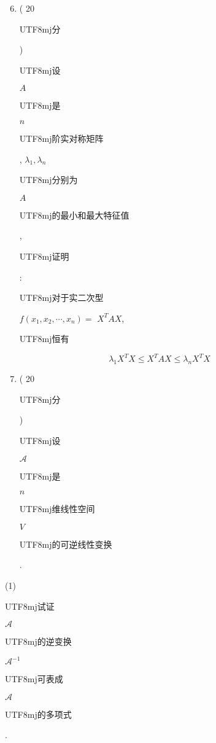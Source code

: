 \documentclass[10pt]{article}
\begin{document}
\begin{enumerate}
  \setcounter{enumi}{5}
  \item ( 20 \begin{CJK}{UTF8}{mj}分\end{CJK}) \begin{CJK}{UTF8}{mj}设\end{CJK} $A$ \begin{CJK}{UTF8}{mj}是\end{CJK} $n$ \begin{CJK}{UTF8}{mj}阶实对称矩阵\end{CJK}, $\lambda_{1}, \lambda_{n}$ \begin{CJK}{UTF8}{mj}分别为\end{CJK} $A$ \begin{CJK}{UTF8}{mj}的最小和最大特征值\end{CJK}, \begin{CJK}{UTF8}{mj}证明\end{CJK}: \begin{CJK}{UTF8}{mj}对于实二次型\end{CJK} $f\left(x_{1}, x_{2}, \cdots, x_{n}\right)=$ $X^{T} A X$, \begin{CJK}{UTF8}{mj}恒有\end{CJK}
\end{enumerate}
$$
\lambda_{1} X^{T} X \leqslant X^{T} A X \leqslant \lambda_{n} X^{T} X
$$

\begin{enumerate}
  \setcounter{enumi}{6}
  \item ( 20 \begin{CJK}{UTF8}{mj}分\end{CJK}) \begin{CJK}{UTF8}{mj}设\end{CJK} $\mathscr{A}$ \begin{CJK}{UTF8}{mj}是\end{CJK} $n$ \begin{CJK}{UTF8}{mj}维线性空间\end{CJK} $V$ \begin{CJK}{UTF8}{mj}的可逆线性变换\end{CJK}.
\end{enumerate}
(1) \begin{CJK}{UTF8}{mj}试证\end{CJK} $\mathscr{A}$ \begin{CJK}{UTF8}{mj}的逆变换\end{CJK} $\mathscr{A}^{-1}$ \begin{CJK}{UTF8}{mj}可表成\end{CJK} $\mathscr{A}$ \begin{CJK}{UTF8}{mj}的多项式\end{CJK}.
\end{document}
